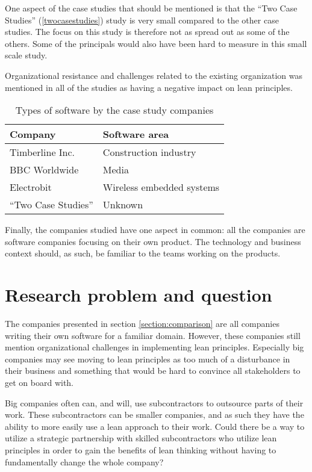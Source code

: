 One aspect of the case studies that should be mentioned is that the  ``Two Case Studies'' (\ref{twocasestudies}) study is very small compared to the other case studies. The focus on this study is therefore not as spread out as some of the others. Some of the principals would also have been hard to measure in this small scale study.

Organizational resistance and challenges related to the existing organization was mentioned in all of the studies as having a negative impact on lean principles.

\begin{table}
  \begin{tabular}{ | l | l |}
    \hline
    \textbf{Company} & \textbf{Software area} \\
    \hline
    Timberline Inc. & Construction industry \\
    \hline
    BBC Worldwide & Media \\
    \hline
    Electrobit & Wireless embedded systems \\
    \hline
    ``Two Case Studies'' & Unknown \\
    \hline
  \end{tabular}
  \caption{Types of software by the case study companies}
  \label{tbl:softwarearea}
\end{table}

Finally, the companies studied have one aspect in common: all the companies are software companies focusing on their own product. The technology and business context should, as such, be familiar to the teams working on the products.

\section{Research problem and question}
\label{section:problem}

The companies presented in section \ref{section:comparison} are all companies writing their own software for a familiar domain. However, these companies still mention organizational challenges in implementing lean principles. Especially big companies may see moving to lean principles as too much of a disturbance in their business and something that would be hard to convince all stakeholders to get on board with.

Big companies often can, and will, use subcontractors to outsource parts of their work. These subcontractors can be smaller companies, and as such they have the ability to more easily use a lean approach to their work. Could there be a way to utilize a strategic partnership with skilled subcontractors who utilize lean principles in order to gain the benefits of lean thinking without having to fundamentally change the whole company?

